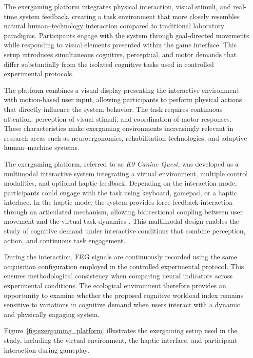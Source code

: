 \documentclass[10pt]{iopart}
\begin{document}
The exergaming platform integrates physical interaction, visual stimuli, and real-time system feedback, creating a task environment that more closely resembles natural human–technology interaction compared to traditional laboratory paradigms. Participants engage with the system through goal-directed movements while responding to visual elements presented within the game interface. This setup introduces simultaneous cognitive, perceptual, and motor demands that differ substantially from the isolated cognitive tasks used in controlled experimental protocols.

The platform combines a visual display presenting the interactive environment with motion-based user input, allowing participants to perform physical actions that directly influence the system behavior. The task requires continuous attention, perception of visual stimuli, and coordination of motor responses. These characteristics make exergaming environments increasingly relevant in research areas such as neuroergonomics, rehabilitation technologies, and adaptive human–machine systems.

The exergaming platform, referred to as \emph{K9 Canine Quest}, was developed as a multimodal interactive system integrating a virtual environment, multiple control modalities, and optional haptic feedback. Depending on the interaction mode, participants could engage with the task using keyboard, gamepad, or a haptic interface. In the haptic mode, the system provides force-feedback interaction through an articulated mechanism, allowing bidirectional coupling between user movement and the virtual task dynamics \cite{22,23}. This multimodal design enables the study of cognitive demand under interactive conditions that combine perception, action, and continuous task engagement.

During the interaction, EEG signals are continuously recorded using the same acquisition configuration employed in the controlled experimental protocol. This ensures methodological consistency when comparing neural indicators across experimental conditions. The ecological environment therefore provides an opportunity to examine whether the proposed cognitive workload index remains sensitive to variations in cognitive demand when users interact with a dynamic and physically engaging system.

Figure~\ref{fig:exergaming_platform} illustrates the exergaming setup used in the study, including the virtual environment, the haptic interface, and participant interaction during gameplay.
\end{document}
